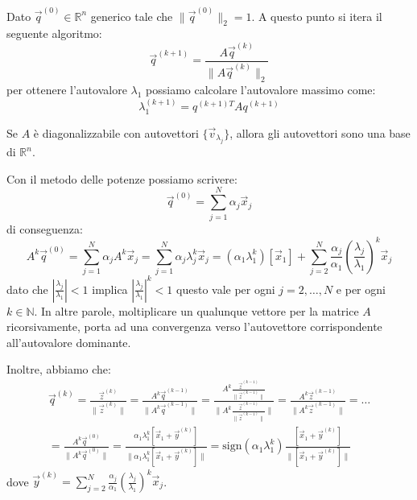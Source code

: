 Dato $\vec{q}^{(0)}\in \mathbb{R}^n$ generico tale che $\|\vec{q}^{(0)}\|_2=1$.
A questo punto si itera il seguente algoritmo:
\begin{equation*}
    \vec{q}^{(k+1)} = \frac{A\vec{q}^{(k)}}{\|A\vec{q}^{(k)}\|_2}
\end{equation*}
per ottenere l'autovalore $\lambda_1$ possiamo calcolare l'autovalore massimo come:
\begin{equation*}
    \lambda_1^{(k + 1)} = q^{(k+1)T}Aq^{(k+1)}
\end{equation*}
\begin{nota}
    Se $A$ è diagonalizzabile con autovettori $\{\vec{v}_{\lambda_j}\}$,
    allora gli autovettori sono una base di $\mathbb{R}^n$.
\end{nota}
Con il metodo delle potenze possiamo scrivere:
\begin{equation}
    \vec{q}^{(0)} = \sum_{j = 1}^{N} \alpha_j \vec{x}_j
\end{equation}
di conseguenza:
\begin{equation}
    A^k \vec{q}^{(0)} = \sum_{j = 1}^{N} \alpha_j A^k \vec{x}_j = \sum_{j = 1}^{N}
    \alpha_j \lambda_j^k \vec{x}_j = (\alpha_1 \lambda_1^k)[\vec{x}_1] + \sum_{j = 2}^{N}
    \frac{\alpha_j}{\alpha_1} \left(\frac{\lambda_j}{\lambda_1}\right)^k \vec{x}_j
\end{equation}
dato che $\left|\frac{\lambda_j}{\lambda_1}\right| < 1$ implica
$\left|\frac{\lambda_j}{\lambda_1}\right|^k < 1$ questo vale per ogni $j = 2,
    \ldots, N$ e per ogni $k \in \mathbb{N}$. In altre parole, moltiplicare un
qualunque vettore per la matrice $A$ ricorsivamente, porta ad una convergenza
verso l'autovettore corrispondente all'autovalore dominante.

Inoltre, abbiamo che:
\begin{equation}
    \begin{aligned}
        \vec{q}^{(k)} = \frac{\vec{z}^{(k)}}{\|\vec{z}^{(k)}\|} = \frac{A^k
            \vec{q}^{(k - 1)}}{\|A^k \vec{q}^{(k - 1)}\|} = \frac{A^k \frac{
                \vec{z}^{(k - 1)}}{\|\vec{z}^{(k - 1)}\|}}{\|A^k \frac{\vec{z}^{(k
                    - 1)}}{\|\vec{z}^{(k - 1)}\|}\|}
        = \frac{A^k \vec{z}^{(k - 1)}}{\|A^k \vec{z}^{(k - 1)}\|} = \ldots \\
        = \frac{A^k \vec{q}^{(0)}}{\|A^k \vec{q}^{(0)}\|}
        = \frac{\alpha_1 \lambda_1^k [\vec{x}_1 + \vec{y}^{(k)}]}{\|\alpha_1
        \lambda_1^k [\vec{x}_1 + \vec{y}^{(k)}]\|}
        = \text{sign}(\alpha_1\lambda_1^k) \frac{[\vec{x}_1 + \vec{y}^{(k)}]}{\|
        [\vec{x}_1 + \vec{y}^{(k)}]\|}
    \end{aligned}
\end{equation}
dove $\vec{y}^{(k)} = \sum_{j = 2}^{N} \frac{\alpha_j}{\alpha_1} \left(\frac{
        \lambda_j}{\lambda_1}\right)^k \vec{x}_j$.

